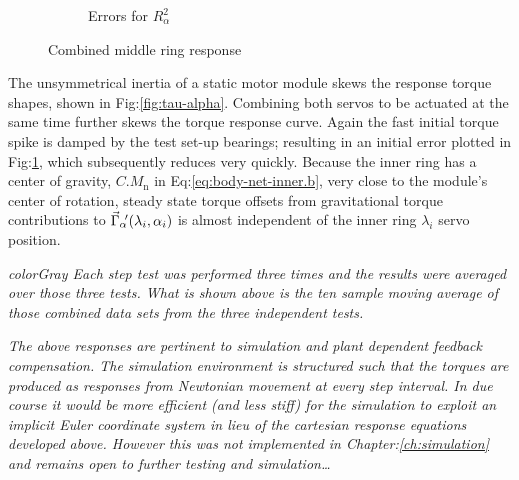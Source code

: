 \begin{figure}[htbp]
\begin{subfigure}{0.49\textwidth}
\caption{Errors for $R^2_{\alpha}$}
\label{fig:tau-alpha-lam-r}
\end{subfigure}
\vspace{-8pt}
\caption{Combined middle ring response}
\label{fig:tau-alpha-lam-response-test}
\vspace{-16pt}
\end{figure}
\par
The unsymmetrical inertia of a static motor module skews the response torque shapes, shown in Fig:\ref{fig:tau-alpha}. Combining both servos to be actuated at the same time further skews the torque response curve. Again the fast initial torque spike is damped by the test set-up bearings; resulting in an initial error plotted in Fig:\ref{fig:tau-alpha-lam-r}, which subsequently reduces very quickly. Because the inner ring has a center of gravity, $C.M_\text{n}$ in Eq:\ref{eq:body-net-inner.b}, very close to the module's center of rotation, steady state torque offsets from gravitational torque contributions to $\vec{\Gamma}_\alpha\hspace{-2pt}'(\lambda_i,\alpha_i)$ is almost independent of the inner ring $\lambda_i$ servo position. 
\par
\emph{color{Gray} Each step test was performed three times and the results were averaged over those three tests. What is shown above is the ten sample moving average of those combined data sets from the three independent tests.}
\par
\emph{\color{Gray}The above responses are pertinent to simulation and plant dependent feedback compensation. The simulation environment is structured such that the torques are produced as responses from Newtonian movement at every step interval. In due course it would be more efficient (and less stiff) for the simulation to exploit an implicit Euler\cite{physicallybased,multibodydynamics} coordinate system in lieu of the cartesian response equations developed above. However this was not implemented in Chapter:\ref{ch:simulation} and remains open to further testing and simulation\ldots}
\newpage
